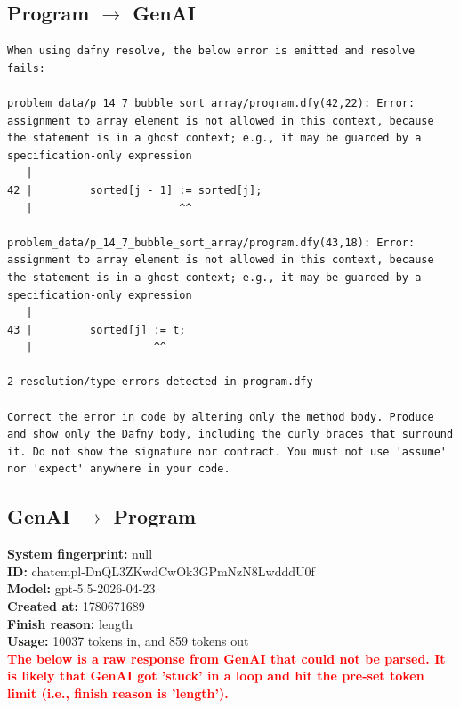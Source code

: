 \documentclass{article}
\begin{document}
\subsection*{Program $\rightarrow$ GenAI}
\begin{lstlisting}
When using dafny resolve, the below error is emitted and resolve fails:

problem_data/p_14_7_bubble_sort_array/program.dfy(42,22): Error: assignment to array element is not allowed in this context, because the statement is in a ghost context; e.g., it may be guarded by a specification-only expression
   |
42 |         sorted[j - 1] := sorted[j];
   |                       ^^

problem_data/p_14_7_bubble_sort_array/program.dfy(43,18): Error: assignment to array element is not allowed in this context, because the statement is in a ghost context; e.g., it may be guarded by a specification-only expression
   |
43 |         sorted[j] := t;
   |                   ^^

2 resolution/type errors detected in program.dfy

Correct the error in code by altering only the method body. Produce and show only the Dafny body, including the curly braces that surround it. Do not show the signature nor contract. You must not use 'assume' nor 'expect' anywhere in your code.
\end{lstlisting}
\subsection*{GenAI $\rightarrow$ Program}
\textbf{System fingerprint: }null
\\\textbf{ID: }chatcmpl-DnQL3ZKwdCwOk3GPmNzN8LwdddU0f
\\\textbf{Model: }gpt-5.5-2026-04-23
\\\textbf{Created at: }1780671689
\\\textbf{Finish reason: }length
\\\textbf{Usage: }10037 tokens in, and 859 tokens out
\\\textcolor{red}{\textbf{The below is a raw response from GenAI that could not be parsed. It is likely that GenAI got 'stuck' in a loop and hit the pre-set token limit (i.e., finish reason is 'length').}}
\begin{lstlisting}

\end{lstlisting}
\end{document}
